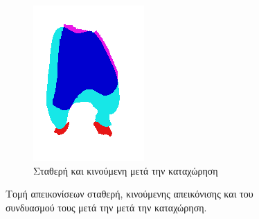 \documentclass[a4paper,12pt]{article}
\begin{document}
\begin{figure}[H]
    \begin{subfigure}[t]{0.4\linewidth}
    \includegraphics[width=\linewidth]{combination_label_before_registration_3.png}
    \caption{Σταθερή και κινούμενη μετά την καταχώρηση}
    \end{subfigure}

    \caption{Τομή απεικονίσεων σταθερή, κινούμενης απεικόνισης και του
             συνδυασμού τους μετά την μετά την καταχώρηση.}
    \label{fig:registration_before:3}
\end{figure}
\end{document}

